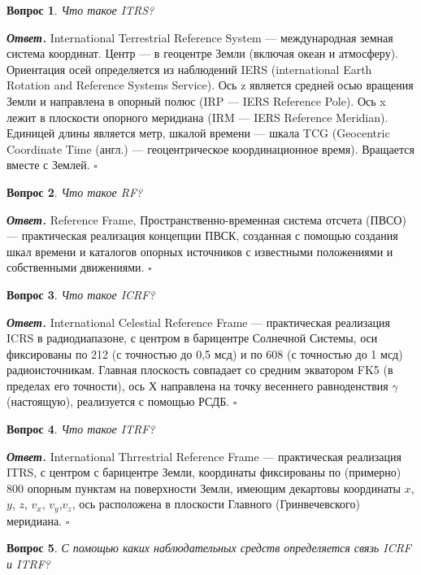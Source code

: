 \documentclass[12pt]{article}
\newtheorem{problem}{Вопрос}
\newenvironment{solution}[1][\it{Ответ}]{\textbf{#1. } }{$\square$}
\begin{document}
	\begin{problem}
		Что такое ITRS?
	\end{problem}
	
	\begin{solution}
		International Terrestrial Reference System — международная земная система координат. Центр — в геоцентре Земли (включая океан и атмосферу). Ориентация осей определяется из наблюдений IERS (international Earth Rotation and Reference Systems Service). Ось z является средней осью вращения Земли и направлена в опорный полюс (IRP — IERS Reference Pole). Ось x лежит в плоскости опорного меридиана (IRM — IERS Reference	Meridian). Единицей длины является метр, шкалой времени — шкала TCG (Geocentric	Coordinate Time (англ.) — геоцентрическое координационное время). Вращается вместе с
		Землей.
	\end{solution}
	\begin{problem}
		Что такое RF?
	\end{problem}
	
	\begin{solution}
	Reference Frame, Пространственно-временная система отсчета (ПВСО) — практическая
	реализация концепции ПВСК, созданная с помощью создания шкал времени и каталогов
	опорных источников с известными положениями и собственными движениями.
	\end{solution}
	
	
		\begin{problem}
		Что такое ICRF?
	\end{problem}
	
	\begin{solution}
		International Celestial Reference Frame — практическая реализация ICRS в радиодиапазоне, с центром в барицентре Солнечной Системы, оси фиксированы по 212 (с точностью до 0,5 мсд) и по 608 (с точностью до 1 мсд) радиоисточникам. Главная плоскость совпадает со средним экватором FK5 (в пределах его точности), ось Х направлена на точку весеннего равноденствия $\gamma$ (настоящую), реализуется с помощью РСДБ.
	\end{solution}
		\begin{problem}
		Что такое ITRF?
	\end{problem}
	
	\begin{solution}
		International Thrrestrial Reference Frame — практическая реализация ITRS, с центром с барицентре Земли, координаты фиксированы по (примерно) 800 опорным пунктам	на поверхности Земли, имеющим декартовы координаты $x$, $y$, $z$, $v_x$, $v_y$,$v_z$, ось расположена
		в плоскости Главного (Гринвечевского) меридиана.
	\end{solution}
		\begin{problem}
		С помощью каких наблюдательных средств определяется связь ICRF и ITRF?
	\end{problem}
	
\end{document}
